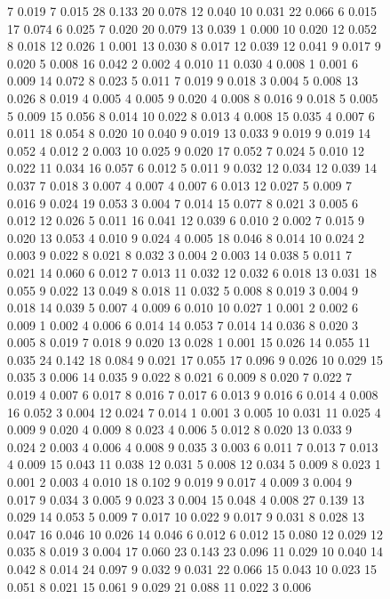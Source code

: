 \begin{figure}[htbp]
7 0.019  7 0.015  28 0.133  20 0.078  12 0.040  
10 0.031  22 0.066  6 0.015  17 0.074  6 0.025  
7 0.020  20 0.079  13 0.039  1 0.000  10 0.020  
12 0.052  8 0.018  12 0.026  1 0.001  13 0.030  
8 0.017  12 0.039  12 0.041  9 0.017  9 0.020  
5 0.008  16 0.042  2 0.002  4 0.010  11 0.030  
4 0.008  1 0.001  6 0.009  14 0.072  8 0.023  
5 0.011  7 0.019  9 0.018  3 0.004  5 0.008  
13 0.026  8 0.019  4 0.005  4 0.005  9 0.020  
4 0.008  8 0.016  9 0.018  5 0.005  5 0.009  
15 0.056  8 0.014  10 0.022  8 0.013  4 0.008  
15 0.035  4 0.007  6 0.011  18 0.054  8 0.020  
10 0.040  9 0.019  13 0.033  9 0.019  9 0.019  
14 0.052  4 0.012  2 0.003  10 0.025  9 0.020  
17 0.052  7 0.024  5 0.010  12 0.022  11 0.034  
16 0.057  6 0.012  5 0.011  9 0.032  12 0.034  
12 0.039  14 0.037  7 0.018  3 0.007  4 0.007  
4 0.007  6 0.013  12 0.027  5 0.009  7 0.016  
9 0.024  19 0.053  3 0.004  7 0.014  15 0.077  
8 0.021  3 0.005  6 0.012  12 0.026  5 0.011  
16 0.041  12 0.039  6 0.010  2 0.002  7 0.015  
9 0.020  13 0.053  4 0.010  9 0.024  4 0.005  
18 0.046  8 0.014  10 0.024  2 0.003  9 0.022  
8 0.021  8 0.032  3 0.004  2 0.003  14 0.038  
5 0.011  7 0.021  14 0.060  6 0.012  7 0.013  
11 0.032  12 0.032  6 0.018  13 0.031  18 0.055  
9 0.022  13 0.049  8 0.018  11 0.032  5 0.008  
8 0.019  3 0.004  9 0.018  14 0.039  5 0.007  
4 0.009  6 0.010  10 0.027  1 0.001  2 0.002  
6 0.009  1 0.002  4 0.006  6 0.014  14 0.053  
7 0.014  14 0.036  8 0.020  3 0.005  8 0.019  
7 0.018  9 0.020  13 0.028  1 0.001  15 0.026  
14 0.055  11 0.035  24 0.142  18 0.084  9 0.021  
17 0.055  17 0.096  9 0.026  10 0.029  15 0.035  
3 0.006  14 0.035  9 0.022  8 0.021  6 0.009  
8 0.020  7 0.022  7 0.019  4 0.007  6 0.017  
8 0.016  7 0.017  6 0.013  9 0.016  6 0.014  
4 0.008  16 0.052  3 0.004  12 0.024  7 0.014  
1 0.001  3 0.005  10 0.031  11 0.025  4 0.009  
9 0.020  4 0.009  8 0.023  4 0.006  5 0.012  
8 0.020  13 0.033  9 0.024  2 0.003  4 0.006  
4 0.008  9 0.035  3 0.003  6 0.011  7 0.013  
7 0.013  4 0.009  15 0.043  11 0.038  12 0.031  
5 0.008  12 0.034  5 0.009  8 0.023  1 0.001  
2 0.003  4 0.010  18 0.102  9 0.019  9 0.017  
4 0.009  3 0.004  9 0.017  9 0.034  3 0.005  
9 0.023  3 0.004  15 0.048  4 0.008  27 0.139  
13 0.029  14 0.053  5 0.009  7 0.017  10 0.022  
9 0.017  9 0.031  8 0.028  13 0.047  16 0.046  
10 0.026  14 0.046  6 0.012  6 0.012  15 0.080  
12 0.029  12 0.035  8 0.019  3 0.004  
17 0.060  23 0.143  23 0.096  11 0.029  10 0.040  
14 0.042  8 0.014  24 0.097  9 0.032  9 0.031  
22 0.066  15 0.043  10 0.023  15 0.051  8 0.021  
15 0.061  9 0.029  21 0.088  11 0.022  3 0.006  

\end{figure}
